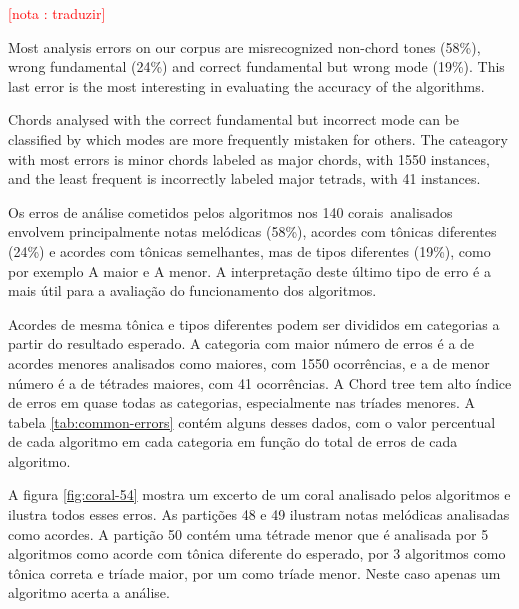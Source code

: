 \documentclass{article}
\newcounter{notacounter}
\newcommand{\nota}[1]{
  \addtocounter{notacounter}{1}
  \textcolor{red}{[nota \arabic{notacounter}: #1]}
}
\begin{document}
\nota{traduzir}

Most analysis errors on our corpus are misrecognized non-chord tones
(58\%), wrong fundamental (24\%) and correct fundamental but wrong mode
(19\%). This last error is the most interesting in evaluating the
accuracy of the algorithms.

Chords analysed with the correct fundamental but incorrect mode can be
classified by which modes are more frequently mistaken for others. The
cateagory with most errors is minor chords labeled as major chords,
with 1550 instances, and the least frequent is incorrectly labeled
major tetrads, with 41 instances.

Os erros de análise cometidos pelos algoritmos nos 140 corais\
analisados envolvem principalmente notas melódicas (58\%), acordes com
tônicas diferentes (24\%) e acordes com tônicas semelhantes, mas de
tipos diferentes (19\%), como por exemplo A maior e A menor. A
interpretação deste último tipo de erro é a mais útil para a avaliação
do funcionamento dos algoritmos.

Acordes de mesma tônica e tipos diferentes podem ser divididos em
categorias a partir do resultado esperado. A categoria com maior
número de erros é a de acordes menores analisados como maiores, com
1550 ocorrências, e a de menor número é a de tétrades maiores, com 41
ocorrências. A Chord tree tem alto índice de erros em quase todas as
categorias, especialmente nas tríades menores. A tabela
\ref{tab:common-errors} contém alguns desses dados, com o valor
percentual de cada algoritmo em cada categoria em função do total de
erros de cada algoritmo.

A figura \ref{fig:coral-54} mostra um excerto de um coral analisado
pelos algoritmos e ilustra todos esses erros. As partições 48 e 49
ilustram notas melódicas analisadas como acordes. A partição 50 contém
uma tétrade menor que é analisada por 5 algoritmos como acorde com
tônica diferente do esperado, por 3 algoritmos como tônica correta e
tríade maior, por um como tríade menor. Neste caso apenas um algoritmo
acerta a análise.
\end{document}
